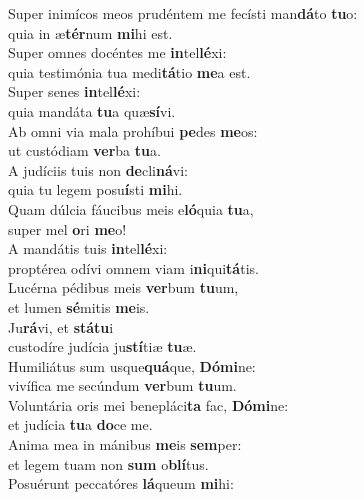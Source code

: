 \evenverse Super inimícos meos prudéntem me fecísti man\textbf{dá}to \textbf{tu}o:~\*\\
\evenverse quia in æ\textbf{tér}num \textbf{mi}hi est.\\
\oddverse Super omnes docéntes me \textbf{in}tel\textbf{lé}xi:~\*\\
\oddverse quia testimónia tua medi\textbf{tá}tio \textbf{me}a est.\\
\evenverse Super senes \textbf{in}tel\textbf{lé}xi:~\*\\
\evenverse quia mandáta \textbf{tu}a quæ\textbf{sí}vi.\\
\oddverse Ab omni via mala prohíbui \textbf{pe}des \textbf{me}os:~\*\\
\oddverse ut custódiam \textbf{ver}ba \textbf{tu}a.\\
\evenverse A judíciis tuis non \textbf{de}cli\textbf{ná}vi:~\*\\
\evenverse quia tu legem posu\textbf{í}sti \textbf{mi}hi.\\
\oddverse Quam dúlcia fáucibus meis e\textbf{ló}quia \textbf{tu}a,~\*\\
\oddverse super mel \textbf{o}ri \textbf{me}o!\\
\evenverse A mandátis tuis \textbf{in}tel\textbf{lé}xi:~\*\\
\evenverse proptérea odívi omnem viam i\textbf{ni}qui\textbf{tá}tis.\\
\oddverse Lucérna pédibus meis \textbf{ver}bum \textbf{tu}um,~\*\\
\oddverse et lumen \textbf{sé}mitis \textbf{me}is.\\
\evenverse Ju\textbf{rá}vi, et \textbf{stá}\textbf{tu}i~\*\\
\evenverse custodíre judícia ju\textbf{stí}tiæ \textbf{tu}æ.\\
\oddverse Humiliátus sum usque\textbf{quá}que, \textbf{Dó}\textbf{mi}ne:~\*\\
\oddverse vivífica me secúndum \textbf{ver}bum \textbf{tu}um.\\
\evenverse Voluntária oris mei benepláci\textbf{ta} fac, \textbf{Dó}\textbf{mi}ne:~\*\\
\evenverse et judícia \textbf{tu}a \textbf{do}ce me.\\
\oddverse Anima mea in mánibus \textbf{me}is \textbf{sem}per:~\*\\
\oddverse et legem tuam non \textbf{sum} o\textbf{blí}tus.\\
\evenverse Posuérunt peccatóres \textbf{lá}queum \textbf{mi}hi:~\*\\
